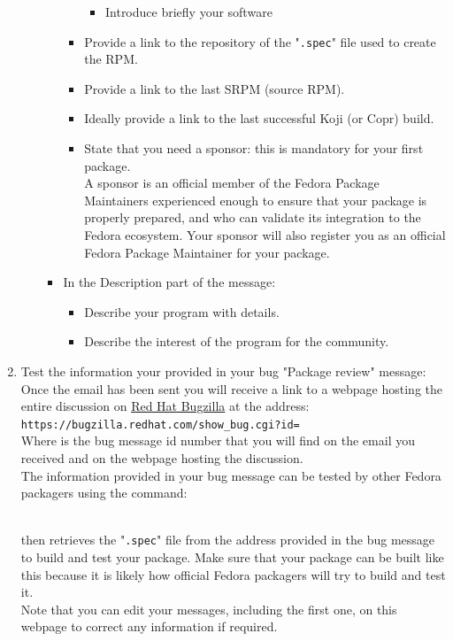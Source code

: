 \begin{enumerate}
\begin{itemize}
\begin{itemize}
\begin{itemize}
\begin{itemize}
\item Introduce briefly your software\\[-0.25cm]
\end{itemize}
\item Provide a link to the repository of the "\texttt{.spec}" file used to create the RPM. 
\item Provide a link to the last SRPM (source RPM).
\item Ideally provide a link to the last successful Koji (or Copr) build. 
\item State that you need a sponsor: this is mandatory for your first package. \\[0.25cm]
A sponsor is an official member of the Fedora Package Maintainers experienced enough to ensure that your package 
is properly prepared, and who can validate its integration to the Fedora ecosystem. 
Your sponsor will also register you as an official Fedora Package Maintainer for your package. \\
\end{itemize}
\item In the Description part of the message:
\begin{itemize}
\item Describe your program with details. 
\item Describe the interest of the program for the community.
\end{itemize}
\end{itemize}
\end{itemize}
\newpage
\item Test the information your provided in your bug "Package review" message: \\[0.25cm]
Once the email has been sent you will receive a link to a webpage hosting the entire discussion on \href{https://bugzilla.redhat.com}{Red Hat Bugzilla} at the address: \\[0.25cm]
\texttt{https://bugzilla.redhat.com/show\_bug.cgi?id=} \\[0.25cm]
\noindent Where  is the bug message id number that you will find on the email you received and on the webpage hosting the discussion. \\
The information provided in your bug message can be tested by other Fedora packagers using the  command: 
\begin{scripti}
\fprompt{~}   
\end{scripti}
\\[-0.75cm]
\noindent {} then retrieves the "\texttt{.spec}" file from the address provided in the bug message to build and test your package. 
Make sure that your package can be built like this because it is likely how official Fedora packagers will try to build and test it. \\
Note that you can edit your messages, including the first one, on this webpage to correct any information if required. 
\end{enumerate}

